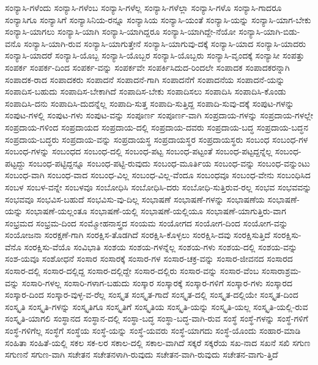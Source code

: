 {ಸಂನ್ಯಾಸಿ-ಗಳೆಂದು
ಸಂನ್ಯಾಸಿ-ಗಳೆಂಬ
ಸಂನ್ಯಾಸಿ-ಗಳೆಲ್ಲ
ಸಂನ್ಯಾಸಿ-ಗಳೆಲ್ಲಾ
ಸಂನ್ಯಾಸಿ-ಗಳೊ
ಸಂನ್ಯಾಸಿ-ಗಾದರೂ
ಸಂನ್ಯಾಸಿಗೂ
ಸಂನ್ಯಾಸಿಗೆ
ಸಂನ್ಯಾಸಿನಿಯ-ರನ್ನೂ
ಸಂನ್ಯಾಸಿಯ
ಸಂನ್ಯಾಸಿ-ಯಂತೆ
ಸಂನ್ಯಾಸಿ-ಯನ್ನು
ಸಂನ್ಯಾಸಿ-ಯಾಗ-ಬೇಕು
ಸಂನ್ಯಾಸಿ-ಯಾಗಲು
ಸಂನ್ಯಾಸಿ-ಯಾಗಿ
ಸಂನ್ಯಾಸಿ-ಯಾಗಿದ್ದರೂ
ಸಂನ್ಯಾಸಿ-ಯಾಗಿದ್ದೇ-ನೆಯೋ
ಸಂನ್ಯಾಸಿ-ಯಾಗಿ-ಬಿಡು-ವನೊ
ಸಂನ್ಯಾಸಿ-ಯಾಗಿ-ರುವ
ಸಂನ್ಯಾಸಿ-ಯಾಗುತ್ತೇನೆ
ಸಂನ್ಯಾಸಿ-ಯಾಗುವು-ದಕ್ಕೆ
ಸಂನ್ಯಾಸಿ-ಯಾದ
ಸಂನ್ಯಾಸಿ-ಯಾದರು
ಸಂನ್ಯಾಸಿ-ಯಾದರೆ
ಸಂನ್ಯಾಸಿ-ಯೊಬ್ಬ
ಸಂನ್ಯಾಸಿ-ಯೊಬ್ಬರ
ಸಂನ್ಯಾಸಿ-ಯೊಬ್ಬರು
ಸಂನ್ಯಾಸಿ-ವೃಂದಕ್ಕೆ
ಸಂನ್ಯಾಸೀ
ಸಂಪತ್ತು
ಸಂಪರ್ಕ
ಸಂಪರ್ಕ-ದಿಂದ
ಸಂಪರ್ಕ-ವನ್ನು
ಸಂಪರ್ಕವೇ
ಸಂಪರ್ಕಿಸಿದುದ-ರಿಂದಲೇ
ಸಂಪಾದಕ
ಸಂಪಾದಕರನ್ನಾಗಿ
ಸಂಪಾದಕ-ರಾದ
ಸಂಪಾದಕರು
ಸಂಪಾದನೆ
ಸಂಪಾದನೆ-ಗಾಗಿ
ಸಂಪಾದನೆಗೆ
ಸಂಪಾದನೆಯ
ಸಂಪಾದನೆ-ಯನ್ನು
ಸಂಪಾದಿಸ-ಬಹುದು
ಸಂಪಾದಿಸ-ಬೇಕಾಗಿದೆ
ಸಂಪಾದಿಸ-ಬೇಕು
ಸಂಪಾದಿಸಲು
ಸಂಪಾದಿಸಿ
ಸಂಪಾದಿಸಿ-ಕೊಂಡು
ಸಂಪಾದಿಸಿ-ದನು
ಸಂಪಾದಿಸಿ-ದುದನ್ನೆಲ್ಲ
ಸಂಪಾದಿ-ಸುತ್ತ
ಸಂಪಾದಿ-ಸುತ್ತಿದ್ದ
ಸಂಪಾದಿ-ಸುವು-ದಕ್ಕೆ
ಸಂಪುಟ-ಗಳನ್ನು
ಸಂಪುಟ-ಗಳಲ್ಲಿ
ಸಂಪುಟ-ಗಳು
ಸಂಪುಟ-ವನ್ನು
ಸಂಪೂರ್ಣ
ಸಂಪೂರ್ಣ-ವಾಗಿ
ಸಂಪ್ರದಾಯ-ಗಳನ್ನು
ಸಂಪ್ರದಾಯ-ಗಳಲ್ಲೇ
ಸಂಪ್ರದಾಯ-ಗಳಿಂದ
ಸಂಪ್ರದಾಯದ
ಸಂಪ್ರದಾಯ-ದಲ್ಲಿ
ಸಂಪ್ರದಾಯ-ದವರು
ಸಂಪ್ರದಾಯ-ಬದ್ಧ
ಸಂಪ್ರದಾಯ-ಬದ್ಧನ
ಸಂಪ್ರದಾಯ-ಬದ್ಧರು
ಸಂಪ್ರದಾಯ-ವನ್ನು
ಸಂಪ್ರದಾಯಸ್ಥ
ಸಂಪ್ರದಾಯಸ್ಥರ
ಸಂಪ್ರದಾಯಸ್ಥರು
ಸಂಬಂಧ
ಸಂಬಂಧ-ಗಳ
ಸಂಬಂಧ-ಗಳನ್ನು
ಸಂಬಂಧದ
ಸಂಬಂಧ-ದಲ್ಲಿ
ಸಂಬಂಧ-ಪಟ್ಟ
ಸಂಬಂಧ-ಪಟ್ಟಂತೆ
ಸಂಬಂಧ-ಪಟ್ಟದ್ದನ್ನೆಲ್ಲ
ಸಂಬಂಧ-ಪಟ್ಟದ್ದು
ಸಂಬಂಧ-ಪಟ್ಟಿದ್ದನ್ನೂ
ಸಂಬಂಧ-ಪಟ್ಟಿ-ರುವುದು
ಸಂಬಂಧ-ಮೂರ್ತಿಯ
ಸಂಬಂಧ-ವನ್ನು
ಸಂಬಂಧ-ವನ್ನುಂಟು
ಸಂಬಂಧ-ವಾಗಿ
ಸಂಬಂಧ-ವಾದ
ಸಂಬಂಧ-ವಿಲ್ಲ
ಸಂಬಂಧ-ವಿಲ್ಲ-ವೆಂದೂ
ಸಂಬಂಧವೂ
ಸಂಬಂಧ-ವೇನು
ಸಂಬಂಧಿಸಿದ
ಸಂಬಳ
ಸಂಬಳ-ವನ್ನೇ
ಸಂಬಳವೂ
ಸಂಬೋಧಿಸಿ
ಸಂಬೋಧಿಸಿ-ದರು
ಸಂಬೋಧಿ-ಸುತ್ತಿರುವ-ರಲ್ಲ
ಸಂಭವ
ಸಂಭವವನ್ನು
ಸಂಭವವೂ
ಸಂಭವಿಸ-ಬಹುದೆ
ಸಂಭವಿಸು-ವು-ದಿಲ್ಲ
ಸಂಭಾಷಣೆ
ಸಂಭಾಷಣೆ-ಗಳನ್ನು
ಸಂಭಾಷಣೆಯ
ಸಂಭಾಷಣೆ-ಯನ್ನು
ಸಂಭಾಷಣೆ-ಯಲ್ಲಂತೂ
ಸಂಭಾಷಣೆ-ಯಲ್ಲಿ
ಸಂಭಾಷಣೆ-ಯಲ್ಲಿಯೂ
ಸಂಭಾಷಣೆ-ಯಾಗುತ್ತಿರು-ವಾಗ
ಸಂಭ್ರಮದ
ಸಂಭ್ರಮ-ದಿಂದ
ಸಂಮ್ಮೋಹನಾಸ್ತ್ರದ
ಸಂಯಮ
ಸಂಯೋಗದ
ಸಂಯೋಗ-ದಿಂದ
ಸಂಯೋಗ-ವನ್ನು
ಸಂಯೋಜನಾ
ಸಂರಕ್ಷಣೆ-ಗಾಗಿ
ಸಂರಕ್ಷಿಸ-ತೊಡಗಿದೆ
ಸಂರಕ್ಷಿಸಿ-ಕೊಳ್ಳಲು
ಸಂರಕ್ಷಿಸಿ-ದವು
ಸಂರಕ್ಷಿಸುತ್ತಿದೆ
ಸಂರಕ್ಷಿಸು-ವೆನೊ
ಸಂರಕ್ಷಿಸು-ವೆಯೊ
ಸಂವಿಭಾತಿ
ಸಂಶಯ
ಸಂಶಯ-ಗಳನ್ನೆಲ್ಲ
ಸಂಶಯ-ಗಳು
ಸಂಶಯ-ದಲ್ಲಿ
ಸಂಶಯ-ವನ್ನು
ಸಂಶ-ಯವೂ
ಸಂಶೋಧನೆ
ಸಂಸಾರ
ಸಂಸಾರಕ್ಕೆ
ಸಂಸಾರ-ಗಳ
ಸಂಸಾರ-ಚಕ್ರ-ವನ್ನು
ಸಂಸಾರ-ಜೀವನದ
ಸಂಸಾರದ
ಸಂಸಾರ-ದಲ್ಲಿ
ಸಂಸಾರ-ದಲ್ಲಿದ್ದ
ಸಂಸಾರ-ದಲ್ಲಿದ್ದೇ
ಸಂಸಾರ-ದಲ್ಲಿರು
ಸಂಸಾರ-ವನ್ನು
ಸಂಸಾರ-ವೆಂಬ
ಸಂಸಾರಾಶ್ರಮ-ವನ್ನು
ಸಂಸಾರಿ-ಗಳಲ್ಲ
ಸಂಸಾರಿ-ಗಳಾಗ-ಬಹುದು
ಸಂಸ್ಕಾರ
ಸಂಸ್ಕಾರಕ್ಕೆ
ಸಂಸ್ಕಾರ-ಗಳಿಗೆ
ಸಂಸ್ಕಾರ-ಗಳು
ಸಂಸ್ಕಾರದ
ಸಂಸ್ಕಾರ-ದಿಂದ
ಸಂಸ್ಕಾರ-ವುಳ್ಳ-ವ-ರೆಲ್ಲ
ಸಂಸ್ಕೃತ
ಸಂಸ್ಕೃತ-ಗಾದೆ
ಸಂಸ್ಕೃತ-ದಲ್ಲಿ
ಸಂಸ್ಕೃತ-ದಲ್ಲಿಯೇ
ಸಂಸ್ಕೃತ-ದಿಂದ
ಸಂಸ್ಕೃತಿ
ಸಂಸ್ಕೃತಿ-ಗಳನ್ನು
ಸಂಸ್ಕೃತಿಗೂ
ಸಂಸ್ಕೃತಿಗೆ
ಸಂಸ್ಕೃತಿಯ
ಸಂಸ್ಕೃತಿ-ಯನ್ನು
ಸಂಸ್ಕೃತಿ-ಯಲ್ಲ
ಸಂಸ್ಕೃತಿ-ಯಲ್ಲಿ-ರುವ
ಸಂಸ್ಕೃತಿ-ಯಾಗಲಿ
ಸಂಸ್ಥಾನದ
ಸಂಸ್ಥಾನ-ದಲ್ಲಿ
ಸಂಸ್ಥಾ-ಬದ್ಧ
ಸಂಸ್ಥಾ-ಬದ್ಧ-ವಾಗಿ-ರುವ
ಸಂಸ್ಥೆ
ಸಂಸ್ಥೆ-ಗಳನ್ನು
ಸಂಸ್ಥೆ-ಗಳಿಗೆ
ಸಂಸ್ಥೆ-ಗಳಿಗೆಲ್ಲ
ಸಂಸ್ಥೆಗೆ
ಸಂಸ್ಥೆಯ
ಸಂಸ್ಥೆ-ಯನ್ನು
ಸಂಸ್ಥೆ-ಯವರು
ಸಂಸ್ಥೆ-ಯಾಗದು
ಸಂಸ್ಥೆ-ಯೊಂದು
ಸಂಹಾರ-ಮಾಡಿ
ಸಂಹಿತಾ
ಸಂಹಿತೆ-ಯಲ್ಲಿ
ಸಕಲ
ಸಕ-ಲರ
ಸಕಾಲ-ದಲ್ಲಿ
ಸಕಾಲ-ವಾಗಿದೆ
ಸಕ್ಕರೆ
ಸಕ್ಕರೆಯ
ಸಖ-ನಾದ
ಸಖನೆ
ಸಖಿ
ಸಗುಣ
ಸಗುಣನೆ
ಸಗುಣ-ವಾಗಿ
ಸಚೇತನ
ಸಚೇತನಳಾಗಿ-ರುವುದು
ಸಚೇತನ-ವಾಗಿ-ರುವುದು
ಸಚೇತನ-ವಾಗು-ತ್ತಿದೆ
}
